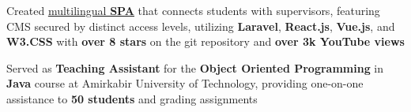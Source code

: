\documentclass[10pt,A4]{article}
\begin{document}
\begin{paracol}{2}
\begin{rightcolumn}
{{{          }\item{
                Created \href{https://github.com/majhoolsoft/Ultimate-CMS-for-laboratory-webpage}{\underline{multilingual \textbf{SPA}}} that connects students with supervisors, featuring CMS secured by distinct access levels, utilizing \textbf{Laravel}, \textbf{React.js}, \textbf{Vue.js}, and \textbf{W3.CSS} with \textbf{over 8 stars} on the git repository and \textbf{over 3k YouTube views}
          }
          \item{
              Served as \textbf{Teaching Assistant} for the \textbf{Object Oriented Programming} in \textbf{Java} course at Amirkabir University of Technology, providing one-on-one assistance to \textbf{50 students} and grading assignments
          }
    }
}
\end{rightcolumn}
\end{paracol}
\end{document}
